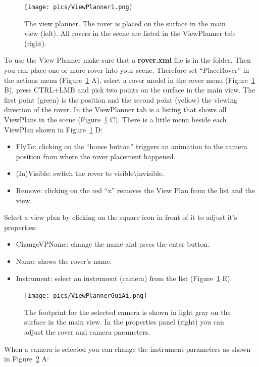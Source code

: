 \begin{figure}[h]
    	\centering
    		\texttt{[image: pics/ViewPlanner1.png]}
    	\caption[View Planner]{The view planner. The rover is placed on the surface in the main view (left). All rovers in the scene are listed in the ViewPlanner tab (right).}
    	\label{fig:viewPlanner}
   \end{figure}
To use the View Planner make sure that a \textbf{rover.xml} file is in the \textbf{} folder. Then you can place one or more rover into your scene.
Therefore set ``PlaceRover'' in the actions menu (Figure~\ref{fig:viewPlanner} A), select a rover model in the rover menu (Figure~\ref{fig:viewPlanner} B), press CTRL+LMB and pick two points on the surface in the main view. The first point (green) is the position and the second point (yellow) the viewing direction of the rover. In the ViewPlanner tab is a listing that shows all ViewPlans in the scene (Figure~\ref{fig:viewPlanner} C). There is a little menu beside each ViewPlan shown in Figure~\ref{fig:viewPlanner} D:
\begin{itemize}
	\item FlyTo: clicking on the ``house button'' triggers an animation to the camera position from where the rover placement happened.
	\item (In)Visible: switch the rover to visible\textbackslash invisible.
	\item Remove: clicking on the red ``x'' removes the View Plan from the list and the view.
\end{itemize}
Select a view plan by clicking on the square icon in front of it to adjust it's properties:
\begin{itemize}
	\item ChangeVPName: change the name and press the enter button.
	\item Name: shows the rover's name.
	\item Instrument: select an instrument (camera) from the list (Figure~\ref{fig:viewPlanner} E).
\end{itemize}
\begin{figure}[h]
    	\centering
    		\texttt{[image: pics/ViewPlannerGuiAi.png]}
    	\caption[View PlannerGui]{The footprint for the selected camera is shown in light gray on the surface in the main view. In the properties panel (right) you can adjust the rover and camera parameters.}
    	\label{fig:viewPlannerGui}
   \end{figure}
When a camera is selected you can change the instrument parameters as shown in Figure~\ref{fig:viewPlannerGui} A:
